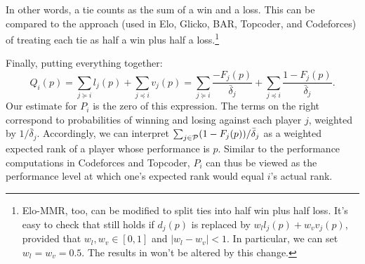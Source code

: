 In other words, a tie counts as the sum of a win and a loss. This can be compared to the approach (used in Elo, Glicko, BAR, Topcoder, and Codeforces) of treating each tie as half a win plus half a loss.\footnote{Elo-MMR, too, can be modified to split ties into half win plus half loss. It's easy to check that  still holds if $d_j(p)$ is replaced by
$w_l l_j(p) + w_v v_j(p)$,
provided that $w_l,w_v\in [0,1]$ and $|w_l-w_v|<1$.
In particular, we can set $w_l=w_v=0.5$. The results in  won't be altered by this change.}

Finally, putting everything together:
\[Q_i(p) = \sum_{j \succeq i} l_j(p) + \sum_{j \preceq i} v_j(p)
= \sum_{j \succeq i} \frac{-F_j(p)}{\bar\delta_j} + \sum_{j \preceq i} \frac{1 - F_j(p)}{\bar\delta_j}.\]
Our estimate for $P_i$ is the zero of this expression. The terms on the right correspond to probabilities of winning and losing against each player $j$, weighted by $1/\bar\delta_j$. Accordingly, we can interpret $\sum_{j\in \mathcal{P}} (1-F_j(p))/\bar\delta_j$ as a weighted expected rank of a player whose performance is $p$. Similar to the performance computations in Codeforces and Topcoder, $P_i$ can thus be viewed as the performance level at which one's expected rank would equal $i$'s actual rank.

